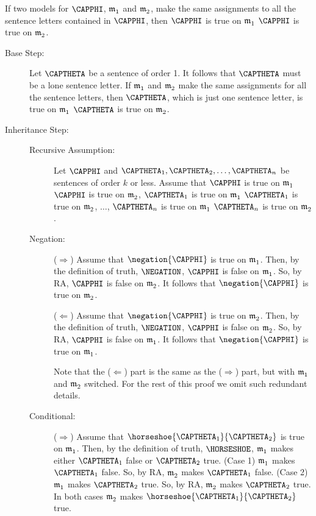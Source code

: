\begin{THEOREM}{}
	If two models for $\CAPPHI$, $\mathfrak{m^{\mathrm{}}_{\mathrm{1}}}$ and $\mathfrak{m^{\mathrm{}}_{\mathrm{2}}}$, make the same assignments to all the sentence letters contained in $\CAPPHI$, then $\CAPPHI$ is true on $\mathfrak{m^{\mathrm{}}_{\mathrm{1}}}$ \Iff $\CAPPHI$ is true on $\mathfrak{m^{\mathrm{}}_{\mathrm{2}}}$.
\end{THEOREM}
\begin{PROOF}
	\begin{description}
		\item[Base Step:]  Let $\CAPTHETA$ be a \GSL{} sentence of order 1.  It follows that $\CAPTHETA$ must be a lone sentence letter.  If $\mathfrak{m^{\mathrm{}}_{\mathrm{1}}}$ and $\mathfrak{m^{\mathrm{}}_{\mathrm{2}}}$ make the same assignments for all the sentence letters, then $\CAPTHETA$, which is just one sentence letter, is true on $\mathfrak{m^{\mathrm{}}_{\mathrm{1}}}$ \Iff $\CAPTHETA$ is true on $\mathfrak{m^{\mathrm{}}_{\mathrm{2}}}$.
		
		\item[Inheritance Step:] \hfill{}
		\begin{description}
			\item[Recursive Assumption:] Let $\CAPPHI$ and $\CAPTHETA_1,\CAPTHETA_2,\ldots,\CAPTHETA_{\integer{n}}$ be sentences of order $k$ or less. Assume that $\CAPPHI$ is true on $\mathfrak{m^{\mathrm{}}_{\mathrm{1}}}$ \Iff $\CAPPHI$ is true on $\mathfrak{m^{\mathrm{}}_{\mathrm{2}}}$, $\CAPTHETA_1$ is true on $\mathfrak{m^{\mathrm{}}_{\mathrm{1}}}$ \Iff $\CAPTHETA_1$ is true on $\mathfrak{m^{\mathrm{}}_{\mathrm{2}}}$, $\ldots$, $\CAPTHETA_n$ is true on $\mathfrak{m^{\mathrm{}}_{\mathrm{1}}}$ \Iff $\CAPTHETA_n$ is true on $\mathfrak{m^{\mathrm{}}_{\mathrm{2}}}$.

			\item[Negation:] ($\Rightarrow$) Assume that $\negation{\CAPPHI}$ is true on $\mathfrak{m^{\mathrm{}}_{\mathrm{1}}}$.
			Then, by the definition of truth, $\NEGATION$, $\CAPPHI$ is false on $\mathfrak{m^{\mathrm{}}_{\mathrm{1}}}$.
			So, by RA, $\CAPPHI$ is false on $\mathfrak{m^{\mathrm{}}_{\mathrm{2}}}$.
			It follows that $\negation{\CAPPHI}$ is true on $\mathfrak{m^{\mathrm{}}_{\mathrm{2}}}$.

			($\Leftarrow$) Assume that $\negation{\CAPPHI}$ is true on $\mathfrak{m^{\mathrm{}}_{\mathrm{2}}}$.
			Then, by the definition of truth, $\NEGATION$, $\CAPPHI$ is false on $\mathfrak{m^{\mathrm{}}_{\mathrm{2}}}$.
			So, by RA, $\CAPPHI$ is false on $\mathfrak{m^{\mathrm{}}_{\mathrm{1}}}$.
			It follows that $\negation{\CAPPHI}$ is true on $\mathfrak{m^{\mathrm{}}_{\mathrm{1}}}$.
			\begin{commentary}
				Note that the ($\Leftarrow$) part is the same as the ($\Rightarrow$) part, but with $\mathfrak{m^{\mathrm{}}_{\mathrm{1}}}$ and $\mathfrak{m^{\mathrm{}}_{\mathrm{2}}}$ switched.
				For the rest of this proof we omit such redundant details.
			\end{commentary}		
			
			\item[Conditional:] ($\Rightarrow$) Assume that $\horseshoe{\CAPTHETA_1}{\CAPTHETA_2}$ is true on $\mathfrak{m^{\mathrm{}}_{\mathrm{1}}}$.
			Then, by the definition of truth, $\HORSESHOE$, $\mathfrak{m^{\mathrm{}}_{\mathrm{1}}}$ makes either $\CAPTHETA_1$ false or $\CAPTHETA_2$ true.
			(Case 1) $\mathfrak{m^{\mathrm{}}_{\mathrm{1}}}$ makes $\CAPTHETA_1$ false.
			So, by RA, $\mathfrak{m^{\mathrm{}}_{\mathrm{2}}}$ makes $\CAPTHETA_1$ false.
			(Case 2) $\mathfrak{m^{\mathrm{}}_{\mathrm{1}}}$ makes $\CAPTHETA_2$ true.
			So, by RA, $\mathfrak{m^{\mathrm{}}_{\mathrm{2}}}$ makes $\CAPTHETA_2$ true.
			In both cases $\mathfrak{m^{\mathrm{}}_{\mathrm{2}}}$ makes $\horseshoe{\CAPTHETA_1}{\CAPTHETA_2}$ true.


\end{description}
\end{description}
\end{PROOF}
